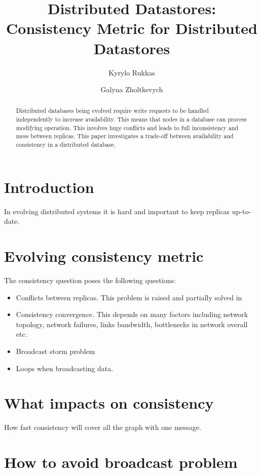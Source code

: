 \documentclass{llncs}
\begin{document}
\title{Distributed Datastores: Consistency Metric for Distributed Datastores}
\author{Kyrylo Rukkas\and Galyna Zholtkevych}
\maketitle
\begin{abstract}
Distributed databases being evolved require write requests to be handled independently to increase availability.
This means that nodes in a database can process modifying operation. This involves huge conflicts and leads to
full inconsistency and mess between replicas. This paper investigates a trade-off between availability and consistency
in a distributed database.
\end{abstract}

\section{Introduction}\label{sec:intro}
In evolving distributed systems it is hard and important to keep replicas up-to-date.

\section{Evolving consistency metric}
The consistency question poses the following questions:
\begin{itemize}
\item Conflicts between replicas. This problem is raised and partially solved in 
\cite{bib:c_ts}
\item Consistency convergence. This depends on many factors including network topology,
network failures, links bandwidth, bottlenecks in network overall etc.
\item Broadcast storm problem
\item Loops when broadcasting data.
\end{itemize}

\section{What impacts on consistency}\label{sec:consistency}
How fast consistency will cover all the graph with one message.
\section{How to avoid broadcast problem}
\end{document}
